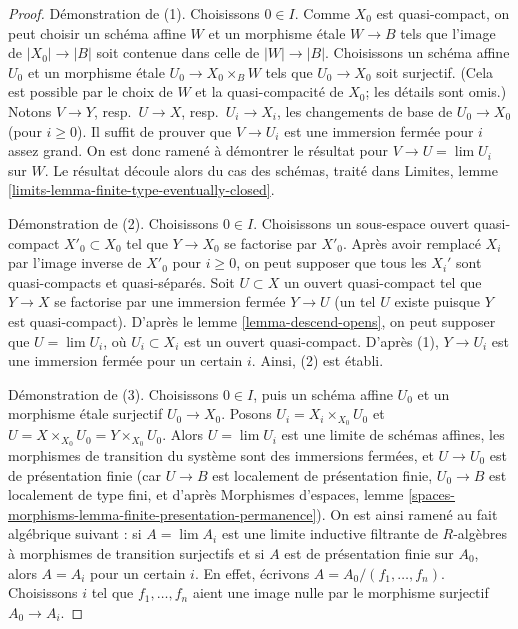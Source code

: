 \begin{proof}
Démonstration de (1). Choisissons $0 \in I$. Comme $X_0$ est quasi-compact,
on peut choisir un schéma affine $W$ et un morphisme étale $W \to B$ tels que
l'image de $|X_0| \to |B|$ soit contenue dans celle de $|W| \to |B|$.
Choisissons un schéma affine $U_0$ et un morphisme étale
$U_0 \to X_0 \times_B W$ tels que $U_0 \to X_0$ soit surjectif.
(Cela est possible par le choix de $W$ et la quasi-compacité de $X_0$;
les détails sont omis.)
Notons $V \to Y$, resp.\ $U \to X$, resp.\ $U_i \to X_i$, les changements
de base de $U_0 \to X_0$ (pour $i \geq 0$). Il suffit de prouver que
$V \to U_i$ est une immersion fermée pour $i$ assez grand. On est donc ramené
à démontrer le résultat pour $V \to U = \lim U_i$ sur $W$. Le résultat découle
alors du cas des schémas, traité dans Limites, lemme
\ref{limits-lemma-finite-type-eventually-closed}.

\medskip\noindent
Démonstration de (2). Choisissons $0 \in I$. Choisissons un sous-espace ouvert
quasi-compact $X'_0 \subset X_0$ tel que $Y \to X_0$ se factorise par $X'_0$.
Après avoir remplacé $X_i$ par l'image inverse de $X'_0$ pour $i \geq 0$,
on peut supposer que tous les $X_i'$ sont quasi-compacts et quasi-séparés.
Soit $U \subset X$ un ouvert quasi-compact tel que $Y \to X$ se factorise
par une immersion fermée $Y \to U$ (un tel $U$ existe puisque $Y$ est
quasi-compact). D'après le lemme \ref{lemma-descend-opens},
on peut supposer que $U = \lim U_i$, où $U_i \subset X_i$ est un ouvert
quasi-compact. D'après (1), $Y \to U_i$ est une immersion fermée pour un
certain $i$. Ainsi, (2) est établi.

\medskip\noindent
Démonstration de (3). Choisissons $0 \in I$, puis un schéma affine $U_0$
et un morphisme étale surjectif $U_0 \to X_0$.
Posons $U_i = X_i \times_{X_0} U_0$ et
$U = X \times_{X_0} U_0 = Y \times_{X_0} U_0$. Alors $U = \lim U_i$ est une
limite de schémas affines, les morphismes de transition du système sont des
immersions fermées, et $U \to U_0$ est de présentation finie (car
$U \to B$ est localement de présentation finie, $U_0 \to B$ est localement
de type fini, et d'après
Morphismes d'espaces, lemme
\ref{spaces-morphisms-lemma-finite-presentation-permanence}).
On est ainsi ramené au fait algébrique suivant : si $A = \lim A_i$
est une limite inductive filtrante de $R$-algèbres à morphismes de transition
surjectifs et si $A$ est de présentation finie sur $A_0$, alors $A = A_i$
pour un certain $i$. En effet, écrivons $A = A_0/(f_1, \ldots, f_n)$.
Choisissons $i$ tel que $f_1, \ldots, f_n$ aient une image nulle par le morphisme surjectif $A_0 \to A_i$.


\end{proof}
